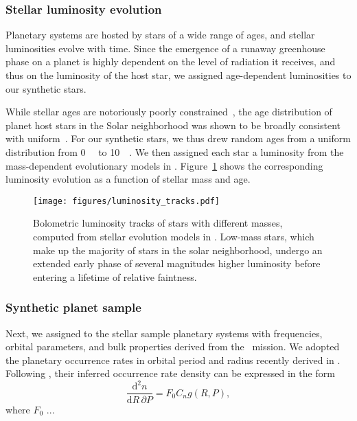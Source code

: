 \documentclass[modern]{aastex631}
\begin{document}
\subsubsection{Stellar luminosity evolution}
Planetary systems are hosted by stars of a wide range of ages, and stellar luminosities evolve with time.
Since the emergence of a runaway greenhouse phase on a planet is highly dependent on the level of radiation it receives, and thus on the luminosity of the host star, we assigned age-dependent luminosities to our synthetic stars.

While stellar ages are notoriously poorly constrained~\cite[e.g.,][]{Adams2005}, the age distribution of planet host stars in the Solar neighborhood was shown to be broadly consistent with uniform~\citep{Reid2007,Gaidos2023}.
For our synthetic stars, we thus drew random ages from a uniform distribution from \SI{0}{\giga\year} to \SI{10}{\giga\year}.
We then assigned each star a luminosity from the mass-dependent evolutionary models in \citet{Baraffe1998}.
Figure~\ref{fig:luminosity_tracks} shows the corresponding luminosity evolution as a function of stellar mass and age.
\begin{figure}[ht!]
    \begin{centering}
        \texttt{[image: figures/luminosity\_tracks.pdf]}
        \caption{
            Bolometric luminosity tracks of stars with different masses, computed from stellar evolution models in \citet{Baraffe1998}.
            Low-mass stars, which make up the majority of stars in the solar neighborhood, undergo an extended early phase of several magnitudes higher luminosity before entering a lifetime of relative faintness.
        }
        \label{fig:luminosity_tracks}
    \end{centering}
\end{figure}


\subsubsection{Synthetic planet sample}\label{sec:syn_planets}
Next, we assigned to the stellar sample planetary systems with frequencies, orbital parameters, and bulk properties derived from the \kepler\ mission.
We adopted the planetary occurrence rates in orbital period and radius recently derived in \citet{Bergsten2022}.
Following \citet{Youdin2011a}, their inferred occurrence rate density can be expressed in the form
\begin{equation}
    \frac{\mathrm{d}^2n}{\mathrm{d}R \, \partial P} = F_0 C_n g(R, P),
\end{equation}
where $F_0$
...
\end{document}
